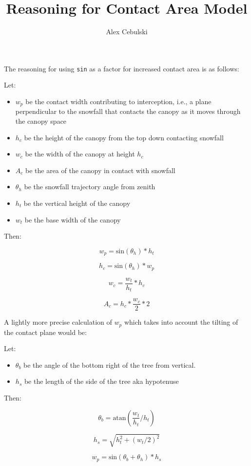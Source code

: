 \documentclass[
  letterpaper,
  DIV=11,
  numbers=noendperiod]{scrartcl}
\title{Reasoning for Contact Area Model}
\author{Alex Cebulski}
\date{}
\providecommand{\tightlist}{%
  \setlength{\itemsep}{0pt}\setlength{\parskip}{0pt}}\usepackage{longtable,booktabs,array}
\begin{document}
\maketitle


The reasoning for using \texttt{sin} as a factor for increased contact
area is as follows:

Let:

\begin{itemize}
\tightlist
\item
  \(w_p\) be the contact width contributing to interception, i.e., a
  plane perpendicular to the snowfall that contacts the canopy as it
  moves through the canopy space
\item
  \(h_c\) be the height of the canopy from the top down contacting
  snowfall
\item
  \(w_c\) be the width of the canopy at height \(h_c\)
\item
  \(A_c\) be the area of the canopy in contact with snowfall
\item
  \(\theta_h\) be the snowfall trajectory angle from zenith
\item
  \(h_t\) be the vertical height of the canopy
\item
  \(w_t\) be the base width of the canopy
\end{itemize}

Then:

\[
w_p = \text{sin}(\theta_h) * h_t
\]

\[
h_c = \text{sin}(\theta_h) * w_p
\]

\[
w_c = \frac{w_t}{h_t} * h_c
\]

\[
A_c = h_c*\frac{w_c}{2}*2
\]

A lightly more precise calculation of \(w_p\) which takes into account
the tilting of the contact plane would be:

Let:

\begin{itemize}
\tightlist
\item
  \(\theta_b\) be the angle of the bottom right of the tree from
  vertical.
\item
  \(h_s\) be the length of the side of the tree aka hypotenuse
\end{itemize}

Then:

\[
\theta_b = \text{atan}(\frac{w_t}{h_t}/h_t)
\]

\[
h_s = \sqrt{h_t^2 + (w_t/2)^2}
\]

\[
w_p = \text{sin}(\theta_b+\theta_h)*h_s
\]
\end{document}
